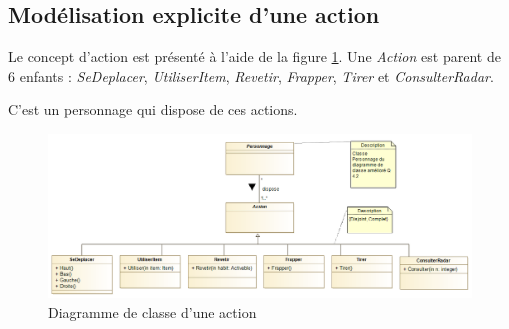
\subsection{Modélisation explicite d'une action}
\label{sec:question11}

Le concept d'action est présenté à l'aide de la figure \ref{fig:action}. Une \emph{Action} est parent de 6 enfants : \emph{SeDeplacer}, \emph{UtiliserItem}, \emph{Revetir}, \emph{Frapper}, \emph{Tirer} et \emph{ConsulterRadar}.

C'est un personnage qui dispose de ces actions.

\begin{figure}[h!]
	\centering
	\includegraphics[width=450pt]{assets/class__Action}
	\caption{Diagramme de classe d'une action}
	\label{fig:action}
\end{figure}

\newpage
